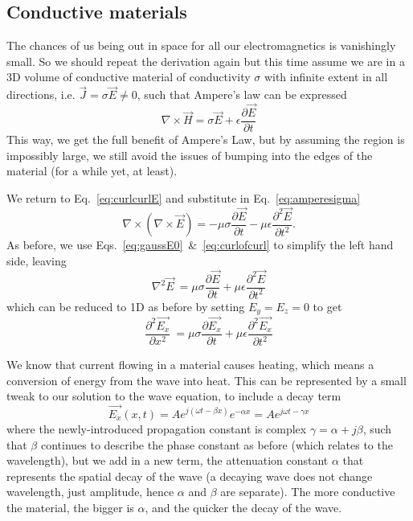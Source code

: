 \documentclass{tufte-handout}
\begin{document}
\subsection{Conductive materials}
The chances of us being out in space for all our electromagnetics is vanishingly small. So we should repeat the derivation again but this time assume we are in a 3D volume of conductive material of conductivity $\sigma$ with infinite extent in all directions, i.e. $\vec{J} = \sigma\vec{E} \neq0$, such that Ampere's law can be expressed
\begin{equation}
\nabla\times\vec{H} = \sigma\vec{E} + \epsilon\frac{\partial\vec{E}}{\partial t} \label{eq:amperesigma}
\end{equation}
 This way, we get the full benefit of Ampere's Law, but by assuming the region is impossibly large, we still avoid the issues of bumping into the edges of the material (for a while yet, at least).

We return to Eq.~\ref{eq:curlcurlE} and substitute in Eq.~\ref{eq:amperesigma}\marginnote{\[ \nabla\times\left(\nabla\times\vec{E}\right) = \nabla\times\left(-\mu\frac{\partial \vec{H}}{\partial t} \right)\]}
\begin{equation}
\nabla\times\left(\nabla\times\vec{E}\right) = -\mu\sigma\frac{\partial \vec{E}}{\partial t}  -\mu\epsilon \frac{\partial^2\vec{E}}{\partial t^2}.
\end{equation}
As before, we use Eqs.~\ref{eq:gaussE0}~\&~\ref{eq:curlofcurl} to simplify the left hand side, leaving
\begin{equation}
\nabla^2\vec{E}\ = \mu\sigma\frac{\partial \vec{E}}{\partial t}  +\mu\epsilon \frac{\partial^2\vec{E}}{\partial t^2}\label{eq:diffEfull}
\end{equation}
which can be reduced to 1D as before by setting $E_y  = E_z = 0$ to get
\begin{equation}
\frac{\partial^2\vec{E_x}}{\partial x^2}\ = \mu\sigma\frac{\partial \vec{E_x}}{\partial t}  +\mu\epsilon \frac{\partial^2\vec{E_x}}{\partial t^2}
\label{eq:diffEfullx}
\end{equation}

We know that current flowing in a material causes heating, which means a conversion of energy from the wave into heat. This can be represented by a small tweak to our solution to the wave equation, to include a decay term
\begin{equation}
\vec{E_x}(x,t) = Ae^{j\left(\omega{}t-\beta{}x\right)}e^{-\alpha{}x} = Ae^{j\omega{}t-\gamma{}x}\label{eq:lossysolution}
\end{equation} 
where the newly-introduced propagation constant is complex $\gamma = \alpha + j\beta$, such that $\beta$ continues to describe the phase constant as before (which relates to the wavelength), but we add in a new term, the attenuation constant $\alpha$ that represents the spatial decay of the wave (a decaying wave does not change wavelength, just amplitude, hence $\alpha$ and $\beta$ are separate). The more conductive the material, the bigger is $\alpha$, and the quicker the decay of the wave. 
\end{document}
